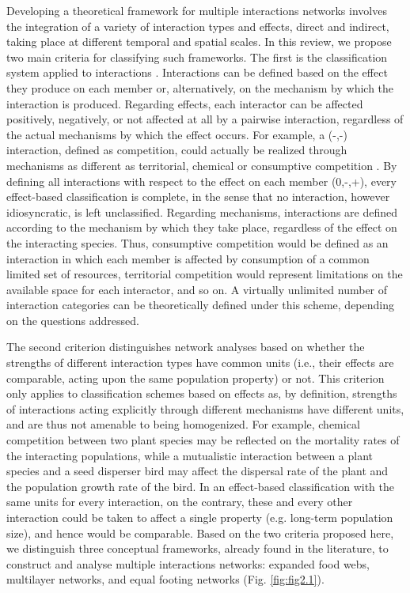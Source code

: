 Developing a theoretical framework for multiple interactions networks involves the integration of a variety of interaction types and effects, direct and indirect, taking place at different temporal and spatial scales. In this review, we propose two main criteria for classifying such frameworks. The first is the classification system applied to interactions \citep{Abrams1987}. Interactions can be defined based on the effect they produce on each member or, alternatively, on the mechanism by which the interaction is produced. Regarding effects, each interactor can be affected positively, negatively, or not affected at all by a pairwise interaction, regardless of the actual mechanisms by which the effect occurs. For example, a (-,-) interaction, defined as competition, could actually be realized through mechanisms as different as territorial, chemical or consumptive competition \citep{Schoener1983}. By defining all interactions with respect to the effect on each member (0,-,+), every effect-based classification is complete, in the sense that no interaction, however idiosyncratic, is left unclassified. Regarding mechanisms, interactions are defined according to the mechanism by which they take place, regardless of the effect on the interacting species. Thus, consumptive competition would be defined as an interaction in which each member is affected by consumption of a common limited set of resources, territorial competition would represent limitations on the available space for each interactor, and so on. A virtually unlimited number of interaction categories can be theoretically defined under this scheme, depending on the questions addressed.

The second criterion distinguishes network analyses based on whether the strengths of different interaction types have common units (i.e., their effects are comparable, acting upon the same population property) or not. This criterion only applies to classification schemes based on effects as, by definition, strengths of interactions acting explicitly through different mechanisms have different units, and are thus not amenable to being homogenized. For example, chemical competition between two plant species may be reflected on the mortality rates of the interacting populations, while a mutualistic interaction between a plant species and a seed disperser bird may affect the dispersal rate of the plant and the population growth rate of the bird. In an effect-based classification with the same units for every interaction, on the contrary, these and every other interaction could be taken to affect a single property (e.g. long-term population size), and hence would be comparable. Based on the two criteria proposed here, we distinguish three conceptual frameworks, already found in the literature, to construct and analyse multiple interactions networks: expanded food webs, multilayer networks, and equal footing networks (Fig. \ref{fig:fig2.1}).

